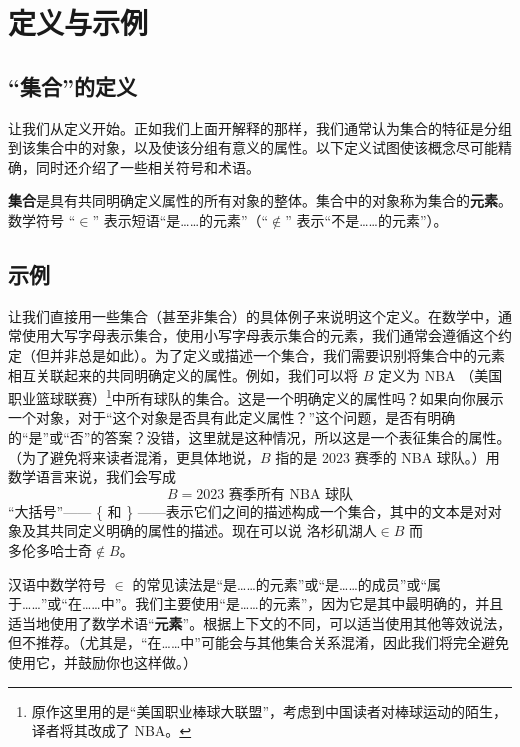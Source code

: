 \section{定义与示例}

\subsection{``集合''的定义}

让我们从定义开始。正如我们上面开解释的那样，我们通常认为集合的特征是分组到该集合中的对象，以及使该分组有意义的属性。以下定义试图使该概念尽可能精确，同时还介绍了一些相关符号和术语。

\begin{definition}
    \textbf{集合}是具有共同明确定义属性的所有对象的整体。集合中的对象称为集合的\textbf{元素}。数学符号 ``$\in$'' 表示短语``是……的元素''（``$\notin$'' 表示``不是……的元素''）。
\end{definition}

\subsection{示例}

让我们直接用一些集合（甚至非集合）的具体例子来说明这个定义。在数学中，通常使用大写字母表示集合，使用小写字母表示集合的元素，我们通常会遵循这个约定（但并非总是如此）。为了定义或描述一个集合，我们需要识别将集合中的元素相互关联起来的共同明确定义的属性。例如，我们可以将 $B$ 定义为 NBA （美国职业篮球联赛）\footnote{原作这里用的是``美国职业棒球大联盟''，考虑到中国读者对棒球运动的陌生，译者将其改成了 NBA。}中所有球队的集合。这是一个明确定义的属性吗？如果向你展示一个对象，对于``这个对象是否具有此定义属性？''这个问题，是否有明确的``是''或``否''的答案？没错，这里就是这种情况，所以这是一个表征集合的属性。（为了避免将来读者混淆，更具体地说，$B$ 指的是 2023 赛季的 NBA 球队。）用数学语言来说，我们会写成
\[B = {\text{2023 赛季所有 NBA 球队}}\]
``大括号''—— \{ 和 \} ——表示它们之间的描述构成一个集合，其中的文本是对对象及其共同定义明确的属性的描述。现在可以说 $\text{洛杉矶湖人} \in B$ 而 $\text{多伦多哈士奇} \notin B$。

汉语中数学符号 $\in$ 的常见读法是``是……的元素''或``是……的成员''或``属于……''或``在……中''。我们主要使用``是……的元素''，因为它是其中最明确的，并且适当地使用了数学术语``\textbf{元素}''。根据上下文的不同，可以适当使用其他等效说法，但不推荐。（尤其是，``在……中''可能会与其他集合关系混淆，因此我们将完全避免使用它，并鼓励你也这样做。）

